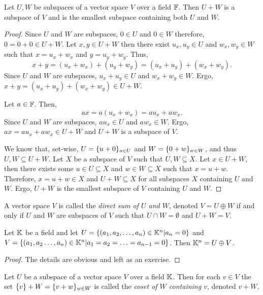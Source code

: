 \begin{proposition}
	Let $U,W$ be subspaces of a vector space $V$ over a field $\mathbb{F}$.
	Then $U+W$ is a subspace of $V$ and is the smallest subspace containing both $U$ and $W$.
\end{proposition}
\begin{proof}
	Since $U$ and $W$ are subspaces, $0\in U$ and $0\in W$ therefore, $0=0+0\in U+W$.
	Let $x,y\in U+W$ then there exist $u_x,u_y\in U$ and $w_x,w_y\in W$ such that $x=u_x+w_x$ and $y=u_y+w_y$.
	Thus,
	\[
		x+y=(u_x+w_x)+(u_y+w_y)=(u_x+u_y)+(w_x+w_y).
	\]
	Since $U$ and $W$ are subspaces, $u_x+u_y\in U$ and $w_x+w_y\in W$.
	Ergo, $x+y=(u_x+u_y)+(w_x+w_y)\in U+W$.

	Let $a\in\mathbb{F}$.
	Then,
	\[
		ax= a(u_x+w_x)=au_x+aw_x.
	\]
	Since $U$ and $W$ are subspaces, $au_x\in U$ and $aw_x\in W$.
	Ergo, $ax=au_x+aw_x\in U+W$ and $U+W$ is a subspace of $V$.

	We know that, set-wise, $U=\lbrace u+0 \rbrace_{u\in U}$ and $W=\lbrace 0+w \rbrace_{w\in W}$, and thus $U,W\subseteq U+W$.
	Let $X$ be a subspace of $V$ such that $U,W\subseteq X$.
	Let $x\in U+W$, then there exists some $u\in U\subseteq X$ and $w\in W\subseteq X$ such that $x=u+w$.
	Therefore, $x=u+w\in X$ and $U+W\subseteq X$ for all subspaces $X$ containing $U$ and $W$.
	Ergo, $U+W$ is the smallest subspace of $V$ containing $U$ and $W$.
\end{proof}

\begin{definition}
	A vector space $V$ is called the \textit{direct sum of $U$ and $W$}, denoted $V=U\oplus W$ if and only if $U$ and $W$ are subspaces of $V$ such that $U\cap W=\emptyset$ and $U+W=V$.
\end{definition}

\begin{example}
	Let $\mathbb{K}$ be a field and let $U=\lbrace (a_1,a_2,\ldots, a_n)\in\mathbb{K}^n| a_n=0 \rbrace$ and $V=\lbrace (a_1,a_2\ldots,a_n)\in\mathbb{K}^n|a_1=a_2=\ldots=a_{n-1}=0 \rbrace$.
	Then $\mathbb{K}^n = U\oplus V$.
\end{example}
\begin{proof}
	The details are obvious and left as an exercise.
\end{proof}

\begin{definition}
	Let $U$ be a subspace of a vector space $V$ over a field $\mathbb{K}$.
	Then for each $v\in V$ the set $\lbrace v \rbrace+W=\lbrace v+w \rbrace_{w\in W}$ is called the \textit{coset of $W$ containing $v$}, denoted $v+W$.
\end{definition}

